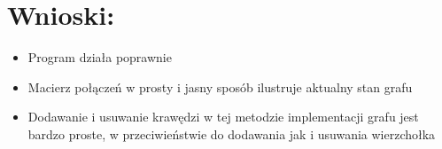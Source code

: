 \documentclass[10 pt]{article}
\begin{document}
\section{Wnioski:}
\begin{itemize}
\item Program działa poprawnie
\item Macierz połączeń w prosty i jasny sposób ilustruje aktualny stan grafu
\item Dodawanie i usuwanie krawędzi w tej metodzie implementacji grafu jest bardzo proste, w przeciwieństwie do dodawania jak i usuwania wierzchołka
\end{itemize}
\end{document}

